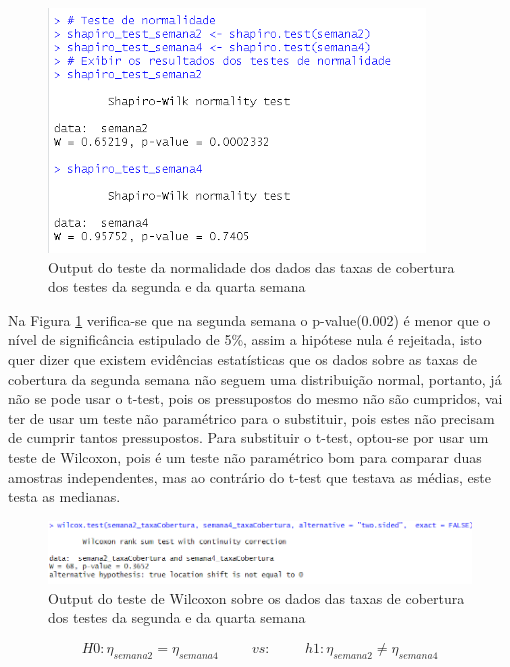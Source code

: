 \documentclass[%
 aip,
cp,  %
 amsmath,amssymb,%
 reprint,%
]{revtex4-2}
\begin{document}
\begin{figure}[!h]
    \centering
    \includegraphics[width=10cm]{imagens/questao1/Shapiro_Q1.png}
    \caption{Output do teste da normalidade dos dados das taxas de cobertura dos testes da segunda e da quarta semana}
    \label{Output_Shapiro_Q1}
\end{figure}

 Na Figura \ref{Output_Shapiro_Q1} verifica-se que na segunda semana o p-value(0.002) é menor que o nível de significância estipulado de 5\%, assim a hipótese nula é rejeitada, isto quer dizer que existem evidências estatísticas que os dados sobre as taxas de cobertura da segunda semana não seguem uma distribuição normal, portanto, já não se pode usar o t-test, pois os pressupostos do mesmo não são cumpridos, vai ter de usar um teste não paramétrico para o substituir, pois estes não precisam de cumprir tantos pressupostos.
 Para substituir o t-test, optou-se por usar um teste de Wilcoxon, pois é um teste não paramétrico bom para comparar duas amostras independentes, mas ao contrário do t-test que testava as médias, este testa as medianas.

\vspace{10pt}



\begin{figure}[h]
    \centering
    \includegraphics[width=13cm]{imagens/questao1/wilcoxon_Teste.png}
    \caption{Output do teste de Wilcoxon sobre os dados das taxas de cobertura dos testes da segunda e da quarta semana}
    \label{wilcoxon_Test}
\end{figure}

\[ H0: {\eta}_{semana2} = {\eta}_{semana4}  \hspace{1cm} vs: \hspace{1cm} h1: {\eta}_{semana2} \ne {\eta}_{semana4} \] %
\end{document}
